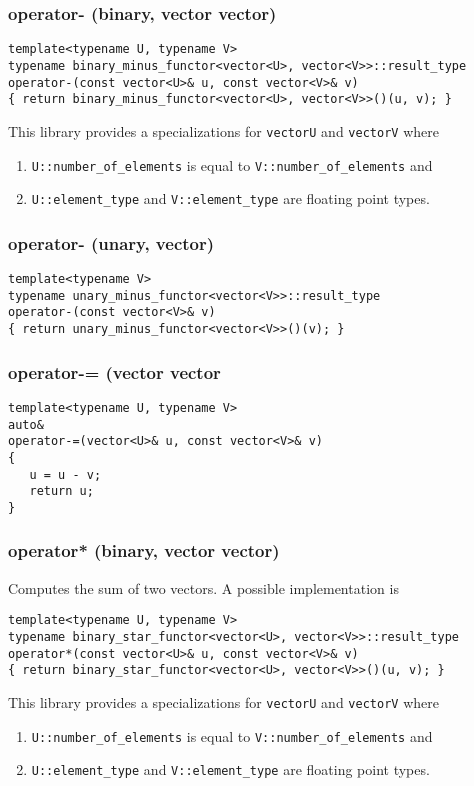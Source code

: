 \documentclass[oneside]{book}
\begin{document}
\subsubsection{operator- (binary, vector vector)}
\begin{verbatim}
template<typename U, typename V>
typename binary_minus_functor<vector<U>, vector<V>>::result_type
operator-(const vector<U>& u, const vector<V>& v)
{ return binary_minus_functor<vector<U>, vector<V>>()(u, v); }
\end{verbatim}
This library provides a specializations for \texttt{vector\textlangle U\textrangle}
and \texttt{vector\textlangle V\textrangle} where
\begin{enumerate}
	\item \texttt{U::number\_of\_elements} is equal to \texttt{V::number\_of\_elements} and
	\item \texttt{U::element\_type} and \texttt{V::element\_type} are floating point types.
\end{enumerate}

\subsubsection{operator- (unary, vector)}
\begin{verbatim}
template<typename V>
typename unary_minus_functor<vector<V>>::result_type
operator-(const vector<V>& v)
{ return unary_minus_functor<vector<V>>()(v); }
\end{verbatim}

\subsubsection{operator-= (vector vector}
\begin{verbatim}
template<typename U, typename V>
auto&
operator-=(vector<U>& u, const vector<V>& v)
{
   u = u - v;
   return u;
}
\end{verbatim}
\subsubsection{operator* (binary, vector vector)}
Computes the sum of two vectors.
A possible implementation is
\begin{verbatim}
template<typename U, typename V>
typename binary_star_functor<vector<U>, vector<V>>::result_type
operator*(const vector<U>& u, const vector<V>& v)
{ return binary_star_functor<vector<U>, vector<V>>()(u, v); }
\end{verbatim}
This library provides a specializations for \texttt{vector\textlangle U\textrangle}
and \texttt{vector\textlangle V\textrangle} where
\begin{enumerate}
	\item \texttt{U::number\_of\_elements} is equal to \texttt{V::number\_of\_elements} and
	\item \texttt{U::element\_type} and \texttt{V::element\_type} are floating point types.
\end{enumerate}
\end{document}
